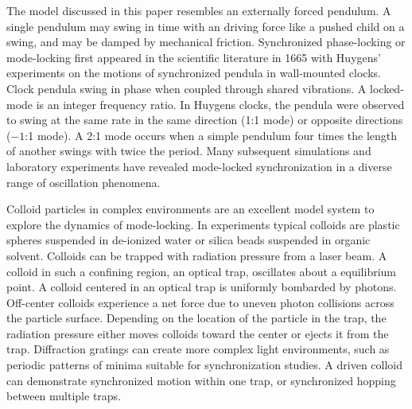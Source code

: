 \documentclass[preprint,showpacs,preprintnumbers,amsmath,amssymb,aps,prb]{revtex4-1}
\theoremstyle{remark}
\begin{document}
The model discussed in this paper
resembles an externally forced pendulum.
A single pendulum 
may swing in time with an %
driving force
like  %
a pushed child on a swing,
and may be damped
by mechanical friction.
Synchronized phase-locking or mode-locking 
first appeared in the scientific literature
in 1665 with 
Huygens'  experiments on the
motions of synchronized 
pendula in wall-mounted clocks.\cite{Bennett2002}
Clock pendula swing in phase
when coupled through shared vibrations.
A locked-mode is an integer frequency ratio.
In Huygens clocks,
the pendula were observed to swing at the same rate
in the same direction (1:1 mode) or
opposite directions ($-1$:1 mode).
A 2:1 mode occurs when a simple pendulum four
times the length of another swings with twice the period.
Many subsequent 
simulations and laboratory experiments
have revealed 
mode-locked synchronization
in a diverse range of 
oscillation phenomena.

Colloid particles in complex environments are an excellent
model system to explore %
the dynamics of mode-locking. %
In experiments %
typical colloids are   
plastic spheres suspended in
de-ionized water or silica beads suspended in organic solvent.
Colloids can be trapped
with 
radiation pressure from 
a laser beam.\cite{Ashkin1997} 
A colloid in such a confining region,
an optical trap, oscillates
about a equilibrium point.
A colloid centered in an optical trap is 
uniformly bombarded by photons. 
Off-center colloids 
experience a net force
due to uneven photon collisions across
the particle surface.
Depending on the 
location of the particle in the trap,
the radiation pressure either moves colloids toward the center 
or ejects it from the trap.
Diffraction gratings can create
more complex light environments, 
such as periodic patterns of minima
suitable for synchronization studies.\cite{Grier2003}
A driven colloid
can demonstrate
synchronized
motion within one trap,
or synchronized hopping between multiple traps. 
\end{document}
